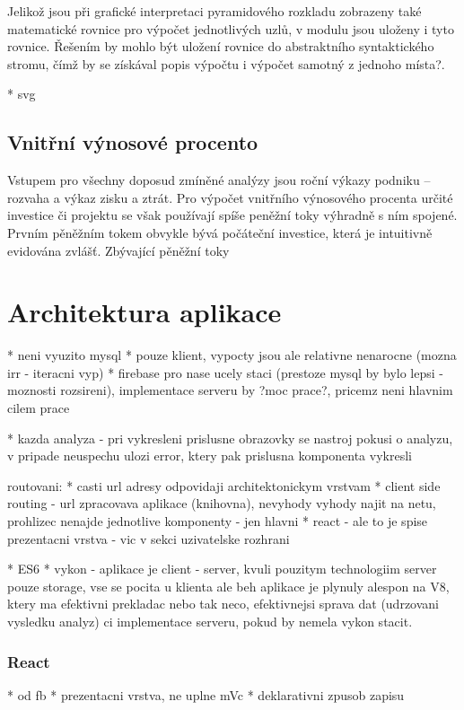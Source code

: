 Jelikož jsou při grafické interpretaci pyramidového rozkladu zobrazeny také matematické rovnice pro výpočet jednotlivých uzlů, v modulu jsou uloženy i tyto rovnice. Řešením by mohlo být uložení rovnice do abstraktního syntaktického stromu, čímž by se získával popis výpočtu i výpočet samotný z jednoho místa?.

* svg

\subsection{Vnitřní výnosové procento}
\label{irr}
Vstupem pro všechny doposud zmíněné analýzy jsou roční výkazy podniku -- rozvaha a výkaz zisku a ztrát. Pro výpočet vnitřního výnosového procenta určité investice či projektu se však používají spíše peněžní toky výhradně s ním spojené. Prvním pěněžním tokem obvykle bývá počáteční investice, která je intuitivně evidována zvlášť. Zbývající pěněžní toky 

\section{Architektura aplikace}

* neni vyuzito mysql
* pouze klient, vypocty jsou ale relativne nenarocne (mozna irr - iteracni vyp)
* firebase pro nase ucely staci (prestoze mysql by bylo lepsi - moznosti rozsireni), implementace serveru by ?moc prace?, pricemz neni hlavnim cilem prace



* kazda analyza - pri vykresleni prislusne obrazovky se nastroj pokusi o analyzu, v pripade neuspechu ulozi error, ktery pak prislusna komponenta vykresli

routovani:
* casti url adresy odpovidaji architektonickym vrstvam
* client side routing - url zpracovava aplikace (knihovna), nevyhody vyhody najit na netu, prohlizec nenajde jednotlive komponenty - jen hlavni
* react - ale to je spise prezentacni vrstva - vic v sekci uzivatelske rozhrani

* ES6
* vykon - aplikace je client - server, kvuli pouzitym technologiim server pouze storage, vse se pocita u klienta ale beh aplikace je plynuly alespon na V8, ktery ma efektivni prekladac nebo tak neco, efektivnejsi sprava dat (udrzovani vysledku analyz) ci implementace serveru, pokud by nemela vykon stacit.

\subsubsection{React}
* od fb
* prezentacni vrstva, ne uplne mVc
* deklarativni zpusob zapisu

